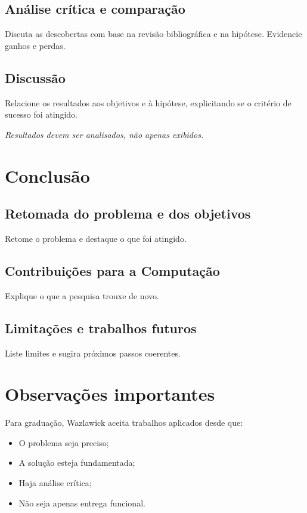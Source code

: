 \documentclass[
    12pt,
    openright,
    oneside,
    a4paper,
    english,
    brazil
]{abntex2}
\begin{document}
\section{Análise crítica e comparação}
Discuta as descobertas com base na revisão bibliográfica e na hipótese. Evidencie ganhos e perdas.

\section{Discussão}
Relacione os resultados aos objetivos e à hipótese, explicitando se o critério de sucesso foi atingido.

\textit{Resultados devem ser analisados, não apenas exibidos.}

\chapter{Conclusão}

\section{Retomada do problema e dos objetivos}
Retome o problema e destaque o que foi atingido.

\section{Contribuições para a Computação}
Explique o que a pesquisa trouxe de novo.

\section{Limitações e trabalhos futuros}
Liste limites e sugira próximos passos coerentes.

\chapter*{Observações importantes}

Para graduação, Wazlawick aceita trabalhos aplicados desde que:
\begin{itemize}
    \item O problema seja preciso;
    \item A solução esteja fundamentada;
    \item Haja análise crítica;
    \item Não seja apenas entrega funcional.
\end{itemize}

\postextual


\end{document}
